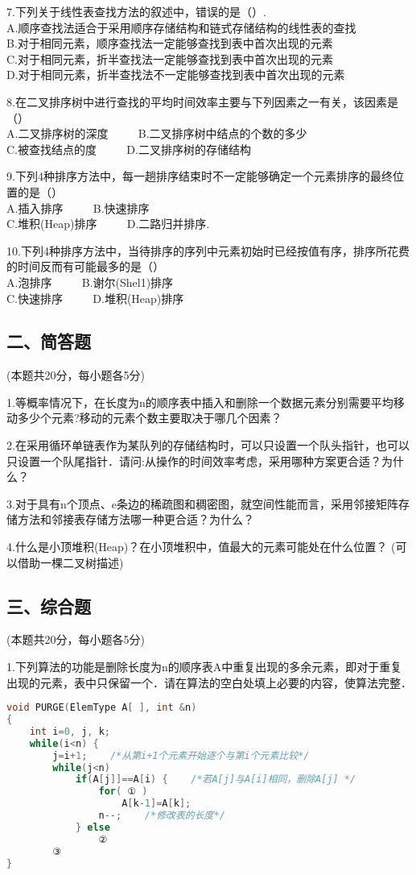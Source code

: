 7.下列关于线性表查找方法的叙述中，错误的是（）. \\
A.顺序查找法适合于采用顺序存储结构和链式存储结构的线性表的查找 \\
B.对于相同元素，顺序查找法一定能够查找到表中首次出现的元素 \\
C.对于相同元素，折半查找法一定能够查找到表中首次出现的元素 \\
D.对于相同元素，折半查找法不一定能够查找到表中首次出现的元素

8.在二叉排序树中进行查找的平均时间效率主要与下列因素之一有关，该因素是（） \\
A.二叉排序树的深度 $\qquad$ B.二叉排序树中结点的个数的多少 \\
C.被查找结点的度 $\qquad$ D.二叉排序树的存储结构

9.下列4种排序方法中，每一趟排序结束时不一定能够确定一个元素排序的最终位置的是（） \\
A.插入排序 $\qquad$ B.快速排序 \\
C.堆积(Heap)排序 $\qquad$ D.二路归并排序.

10.下列4种排序方法中，当待排序的序列中元素初始时已经按值有序，排序所花费的时间反而有可能最多的是（） \\
A.泡排序 $\qquad$ B.谢尔(Shel1)排序 \\
C.快速排序 $\qquad$ D.堆积(Heap)排序

\subsection{二、简答题}
(本题共20分，每小题各5分)

1.等概率情况下，在长度为n的顺序表中插入和删除一个数据元素分别需要平均移动多少个元素?移动的元素个数主要取决于哪几个因素？

2.在采用循环单链表作为某队列的存储结构时，可以只设置一个队头指针，也可以只设置一个队尾指针．请问:从操作的时间效率考虑，采用哪种方案更合适？为什么？

3.对于具有n个顶点、e条边的稀疏图和稠密图，就空间性能而言，采用邻接矩阵存储方法和邻接表存储方法哪一种更合适？为什么？

4.什么是小顶堆积(Heap)？在小顶堆积中，值最大的元素可能处在什么位置？ (可以借助一棵二叉树描述)

\subsection{三、综合题}
(本题共20分，每小题各5分)

1.下列算法的功能是删除长度为n的顺序表A中重复出现的多余元素，即对于重复出现的元素，表中只保留一个．请在算法的空白处填上必要的内容，使算法完整．
\begin{lstlisting}[language=cpp]
void PURGE(ElemType A[ ], int &n)
{
    int i=0, j, k;
    while(i<n) {
        j=i+1;    /*从第i+1个元素开始逐个与第i个元素比较*/
        while(j<n)
            if(A[j]]==A[i) {    /*若A[j]与A[i]相同，删除A[j] */
                for( ① )
                    A[k-1]=A[k];
                n--;    /*修改表的长度*/
            } else
                ②
        ③
}
\end{lstlisting}

